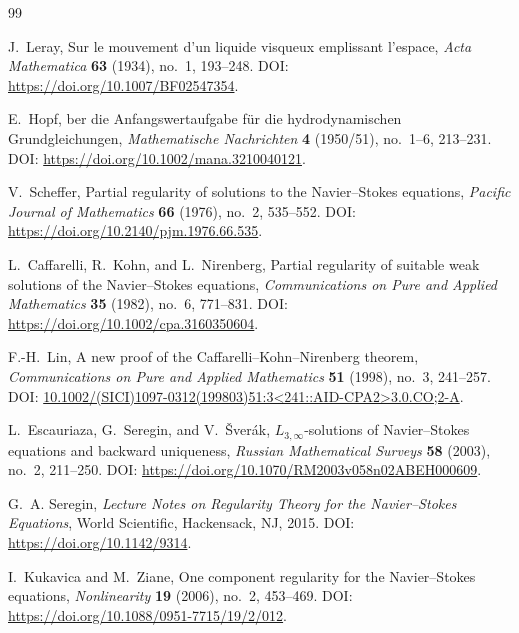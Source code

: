 \documentclass[11pt]{article}
\numberwithin{equation}{section}
\theoremstyle{remark}
\begin{document}
\begin{thebibliography}{99}

J.~Leray,
\newblock Sur le mouvement d'un liquide visqueux emplissant l'espace,
\newblock \emph{Acta Mathematica} \textbf{63} (1934), no.~1, 193--248.
\newblock DOI: \url{https://doi.org/10.1007/BF02547354}.

E.~Hopf,
ber die Anfangswertaufgabe f{\"u}r die hydrodynamischen Grundgleichungen,
\newblock \emph{Mathematische Nachrichten} \textbf{4} (1950/51), no.~1--6, 213--231.
\newblock DOI: \url{https://doi.org/10.1002/mana.3210040121}.

V.~Scheffer,
\newblock Partial regularity of solutions to the Navier--Stokes equations,
\newblock \emph{Pacific Journal of Mathematics} \textbf{66} (1976), no.~2, 535--552.
\newblock DOI: \url{https://doi.org/10.2140/pjm.1976.66.535}.

L.~Caffarelli, R.~Kohn, and L.~Nirenberg,
\newblock Partial regularity of suitable weak solutions of the Navier--Stokes equations,
\newblock \emph{Communications on Pure and Applied Mathematics} \textbf{35} (1982), no.~6, 771--831.
\newblock DOI: \url{https://doi.org/10.1002/cpa.3160350604}.

F.-H.~Lin,
\newblock A new proof of the Caffarelli--Kohn--Nirenberg theorem,
\newblock \emph{Communications on Pure and Applied Mathematics} \textbf{51} (1998), no.~3, 241--257.
\newblock DOI: \href{https://doi.org/10.1002/(SICI)1097-0312(199803)51:3\%3C241::AID-CPA2\%3E3.0.CO;2-A}{10.1002/(SICI)1097-0312(199803)51:3<241::AID-CPA2>3.0.CO;2-A}.

L.~Escauriaza, G.~Seregin, and V.~\v{S}ver\'ak,
\newblock $L_{3,\infty}$-solutions of Navier--Stokes equations and backward uniqueness,
\newblock \emph{Russian Mathematical Surveys} \textbf{58} (2003), no.~2, 211--250.
\newblock DOI: \url{https://doi.org/10.1070/RM2003v058n02ABEH000609}.

G.~A. Seregin,
\newblock \emph{Lecture Notes on Regularity Theory for the Navier--Stokes Equations},
\newblock World Scientific, Hackensack, NJ, 2015.
\newblock DOI: \url{https://doi.org/10.1142/9314}.

I.~Kukavica and M.~Ziane,
\newblock One component regularity for the Navier--Stokes equations,
\newblock \emph{Nonlinearity} \textbf{19} (2006), no.~2, 453--469.
\newblock DOI: \url{https://doi.org/10.1088/0951-7715/19/2/012}.


\end{thebibliography}
\end{document}
